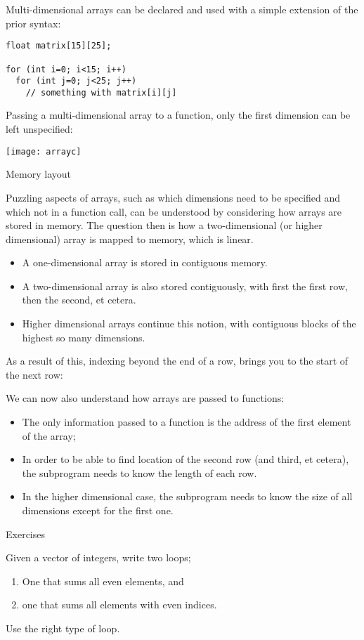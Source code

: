 Multi-dimensional arrays can be declared and used with a simple extension of
the prior syntax:
\begin{lstlisting}
float matrix[15][25];

for (int i=0; i<15; i++)
  for (int j=0; j<25; j++)
    // something with matrix[i][j]
\end{lstlisting}

Passing a multi-dimensional array to a function, only the first
dimension can be left unspecified:
%

\texttt{[image: arrayc]}

 {Memory layout}

Puzzling aspects of arrays, such as which dimensions need to be
specified and which not in a function call, can be understood by
considering how arrays are stored in memory.
The question then is how a two-dimensional (or higher dimensional)
array is mapped to memory, which is linear.
\begin{itemize}
\item A one-dimensional array is stored in contiguous memory.
\item A two-dimensional array is also stored contiguously, with first
  the first row, then the second, et cetera.
\item Higher dimensional arrays continue this notion, with contiguous
  blocks of the highest so many dimensions.
\end{itemize}

As a result of this, indexing beyond the end of a row, brings you to the
start of the next row:
%

We can now also understand how arrays are passed to functions:
\begin{itemize}
\item The only information passed to a function is the address of the
  first element of the array;
\item In order to be able to find location of the second row (and
  third, et cetera), the subprogram needs to know the length of each
  row.
\item In the higher dimensional case, the subprogram needs to know the
  size of all dimensions except for the first one.
\end{itemize}

 {Exercises}

\begin{exercise}
  \label{ex:even-index}
  Given a vector of integers, write two loops;
  \begin{enumerate}
  \item One that sums all even elements, and
  \item one that sums all elements with even indices.
  \end{enumerate}
  Use the right type of loop.
\end{exercise}

